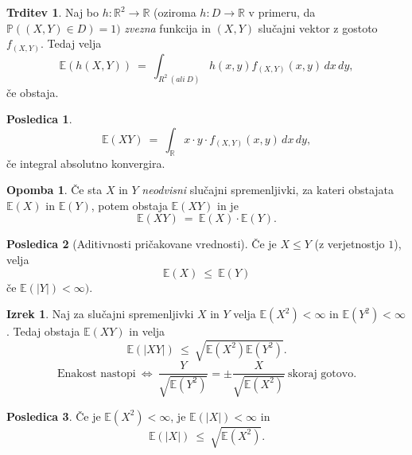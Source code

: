 \documentclass[11pt]{article}
\newcommand{\p}{\mathbb{P}}
\newcommand{\E}{\mathbb{E}}
\newcommand{\R}{\mathbb{R}}
\newcommand{\1}{\mathbbm{1}}
\theoremstyle{definition}
\theoremstyle{definition}
\newtheorem{trditev}{Trditev}[section]
\theoremstyle{definition}
\newtheorem{izrek}{Izrek}[section]
\newtheorem*{posledica}{Posledica}
\newtheorem*{opomba}{Opomba}
\begin{document}
\begin{trditev}

Naj bo $h: \R^2 \rightarrow \R$ (oziroma $h: D \rightarrow \R$ v primeru, da $\p((X, Y) \in D) = 1)$ \textit{zvezna} funkcija in $(X, Y)$ slučajni vektor z gostoto $f_{(X, Y)}$. Tedaj velja
$$\E(h(X, Y)) ~=~ \int_{R^2 ~(ali~D)} h(x, y) f_{(X, Y)}(x, y)\,dx\,dy,$$
če obstaja.

\end{trditev}
\vspace{0.5cm}

\begin{posledica}

$$\E(XY) ~=~ \int_{\R} x \cdot y \cdot f_{(X, Y)}(x, y)\,dx\,dy,$$
če integral absolutno konvergira. 

\end{posledica}
\vspace{0.5cm}

\begin{opomba}

Če sta $X$ in $Y$ \textit{neodvisni} slučajni spremenljivki, za kateri obstajata $\E(X)$ in $\E(Y)$, potem obstaja $\E(XY)$ in je
$$\E(XY) ~=~ \E(X) \cdot \E(Y).$$

\end{opomba}
\vspace{0.5cm}

\begin{posledica}[Aditivnosti pričakovane vrednosti]

Če je $X \leq Y$ (z verjetnostjo $1$), velja
$$\E(X) ~\leq~ \E(Y)$$
če $\E(|Y|) < \infty)$.

\end{posledica}
\vspace{0.5cm}

\begin{izrek}

Naj za slučajni spremenljivki $X$ in $Y$ velja $\E(X^2) < \infty$ in $\E(Y^2) < \infty$. Tedaj obstaja $\E(XY)$ in velja
$$\E(|XY|) ~\leq~ \sqrt{\E(X^2)\E(Y^2)}.$$
$$\text{Enakost nastopi} ~\iff~ \frac{Y}{\sqrt{\E(Y^2)}} = \pm \frac{X}{\sqrt{\E(X^2)}}~\text{skoraj gotovo.}$$

\end{izrek}
\vspace{0.5cm}

\begin{posledica}

Če je $\E(X^2) < \infty$, je $\E(|X|) < \infty$ in
$$\E(|X|) ~\leq~ \sqrt{\E(X^2)}.$$

\end{posledica}
\vspace{0.5cm}
\end{document}
